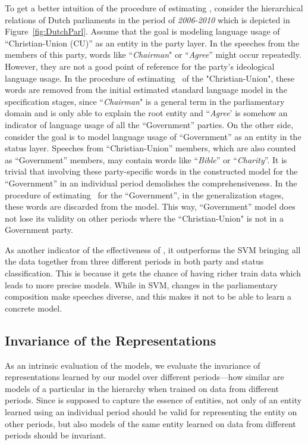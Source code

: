 To get a better intuition of the procedure of estimating \acswlm, consider the hierarchical relations of Dutch parliaments in the period of \emph{2006-2010} which is depicted in Figure~\ref{fig:DutchParl}. 
%
Assume that the goal is modeling language usage of ``Christian-Union (CU)'' as an entity in the party layer. In the speeches from the members of this party, words like ``\emph{Chairman}" or ``\emph{Agree}'' might occur repeatedly. However, they are not a good point of reference for the party's ideological language usage. In the procedure of estimating \acswlm\ of the "Christian-Union", these words are removed from the initial estimated standard language model in the specification stages, since ``\emph{Chairman}" is a general term in the parliamentary domain and is only able to explain the root entity and ``\emph{Agree}' is somehow an indicator of language usage of all the ``Government'' parties.
%
On the other side, consider the goal is to model language usage of ``Government'' as an entity in the status layer. Speeches from ``Christian-Union'' members, which are also counted as ``Government'' members, may contain words like ``\emph{Bible}'' or ``\emph{Charity}''.  It is trivial that involving these party-specific words in the constructed model for the ``Government'' in an individual period demolishes the comprehensiveness. In the procedure of estimating \acswlm\ for the ``Government'', in the generalization stages, these words are discarded from the model. This way, ``Government'' model does not lose its validity on other periods where the ``Christian-Union" is not in a Government party.

As another indicator of the effectiveness of \acswlm, it outperforms the SVM bringing all the data together from three different periods in both party and status classification. This is because it gets the chance of having richer train data which leads to more precise models. While in SVM, changes in the parliamentary composition make speeches diverse, and this makes it not to be able to learn a concrete model. 
\subsection{Invariance of the Representations}

As an intrinsic evaluation of the models, we evaluate the invariance of representations learned by our model over different periods\:---\:how similar are models of a particular in the hierarchy when trained on data from different periods. 
%
Since \achswlm is supposed to capture the essence of entities, not only \achswlm of an entity learned using an individual period should be valid for representing the entity on other periods, but also models of the same entity learned on data from different periods should be invariant. 


